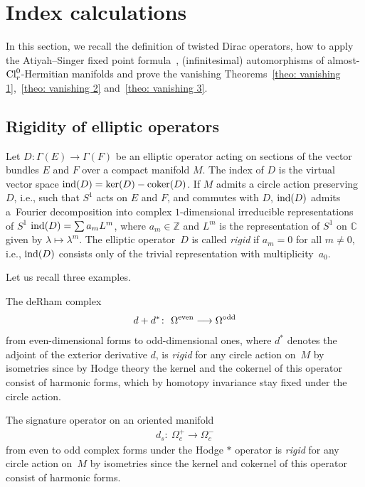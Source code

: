 \documentclass[10pt,a4paper]{amsart}
\newcommand{\Z}{\mbox{$\mathbb Z$}}
\newcommand{\C}{\mbox{$\mathbb C$}}\newcommand{\R}{\mbox{$\mathbb R$}}
\newcommand{\ind}{\mbox{\rm ind}}
\newcommand{\coker}{\mbox{\rm coker}}
\numberwithin{equation}{section}
\begin{document}
\section{Index calculations}\label{sec: dirac-operators}

In this section, we recall the def\/inition of twisted Dirac operators, how to apply the Atiyah--Singer f\/ixed point formula~\cite{AS3}, (inf\/initesimal) automorphisms of almost-${\rm Cl}_r^0$-Hermitian manifolds and prove the vanishing Theorems~\ref{theo: vanishing 1},~\ref{theo: vanishing 2} and~\ref{theo: vanishing 3}.

\subsection{Rigidity of elliptic operators}

\begin{Definition}
Let $D\colon \Gamma(E) \longrightarrow \Gamma(F)$ be an elliptic operator acting on sections of the vector bundles $E$ and $F$ over a compact manifold $M$. The index of $D$ is the virtual vector space $\ind (D)=\ker(D)-\coker(D)$. If $M$ admits a circle action preserving $D$, i.e., such that $S^1$ acts on $E$ and $F$, and commutes with $D$, $\ind(D)$ admits a~Fourier decomposition into complex $1$-di\-men\-sional irreducible representations of $S^1$ $\ind(D) =\sum a_m L^m$, where $a_m\in \Z$ and $L^m$ is the representation of $S^1$ on $\C$ given by $\lambda \mapsto \lambda^m$. The elliptic operator~$D$ is called {\em rigid} if $a_m=0$ for all $m\neq 0$, i.e., $\ind(D)$ consists only of the trivial representation with multiplicity~$a_0$.
\end{Definition}

Let us recall three examples.

\begin{Example}
The deRham complex
\begin{gather*} d+d^* \colon \ \Omega^{\rm even} \longrightarrow \Omega^{\rm odd}\end{gather*}
from even-dimensional forms to odd-dimensional ones, where $d^*$ denotes the adjoint of the exterior derivative $d$, is {\em rigid} for any circle action on~$M$ by isometries since by Hodge theory the kernel and the cokernel of this operator consist of harmonic forms, which by homotopy invariance stay f\/ixed under the circle action.
\end{Example}

\begin{Example} The signature operator on an oriented manifold
\begin{gather*} d_s \colon \ \Omega_c^{+} \longrightarrow \Omega_c^{-}\end{gather*}
from even to odd complex forms under the Hodge $*$ operator is {\em rigid} for any circle action on~$M$ by isometries since the kernel and cokernel of this operator consist of harmonic forms.
\end{Example}
\end{document}

